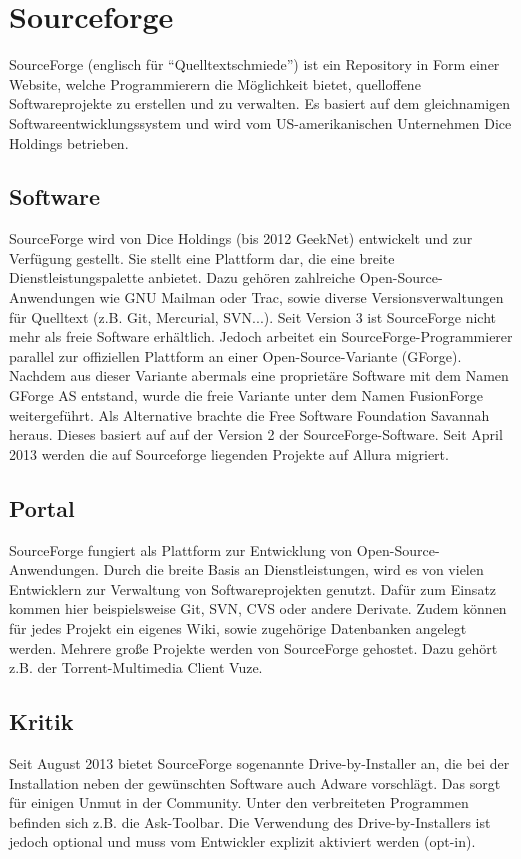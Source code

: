 \section{Sourceforge}
SourceForge (englisch für ``Quelltextschmiede'') ist ein Repository in Form einer Website,
welche Programmierern die Möglichkeit bietet, quelloffene Softwareprojekte zu erstellen und zu verwalten. 
Es basiert auf dem gleichnamigen Softwareentwicklungssystem und wird vom US-amerikanischen Unternehmen 
Dice Holdings betrieben.
\subsection{Software}
SourceForge wird von Dice Holdings (bis 2012 GeekNet) entwickelt und zur Verfügung gestellt.
Sie stellt eine Plattform dar, die eine breite Dienstleistungspalette anbietet. Dazu gehören zahlreiche Open-Source-Anwendungen
wie GNU Mailman oder Trac, sowie diverse Versionsverwaltungen für Quelltext (z.B. Git, Mercurial, SVN...).
Seit Version 3 ist SourceForge nicht mehr als freie Software erhältlich. Jedoch arbeitet ein SourceForge-Programmierer
parallel zur offiziellen Plattform an einer Open-Source-Variante (GForge). Nachdem aus dieser Variante 
abermals eine proprietäre Software mit dem Namen GForge AS entstand, wurde die freie Variante unter dem Namen FusionForge
weitergeführt. Als Alternative brachte die Free Software Foundation Savannah heraus. Dieses basiert auf
auf der Version 2 der SourceForge-Software.
Seit April 2013 werden die auf Sourceforge liegenden Projekte auf Allura migriert.
\subsection{Portal}
SourceForge fungiert als Plattform zur Entwicklung von Open-Source-Anwendungen. Durch die breite Basis an
Dienstleistungen, wird es von vielen Entwicklern zur Verwaltung von Softwareprojekten genutzt. Dafür zum Einsatz kommen
hier beispielsweise Git, SVN, CVS oder andere Derivate. Zudem können für jedes Projekt
ein eigenes Wiki, sowie zugehörige Datenbanken angelegt werden.
Mehrere große Projekte werden von SourceForge gehostet. Dazu gehört z.B. der Torrent-Multimedia Client Vuze.
\subsection{Kritik}
Seit August 2013 bietet SourceForge sogenannte Drive-by-Installer an, die bei der Installation 
neben der gewünschten Software auch Adware vorschlägt. Das sorgt für einigen Unmut in der Community. 
Unter den verbreiteten Programmen befinden sich z.B. die Ask-Toolbar. Die Verwendung des
Drive-by-Installers ist jedoch optional und muss vom Entwickler explizit aktiviert werden (opt-in).

